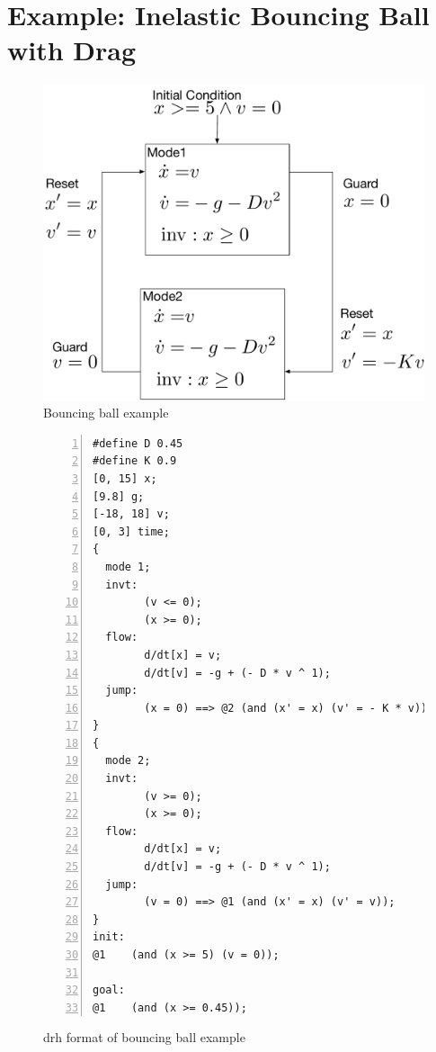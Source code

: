 \section{Example: Inelastic Bouncing Ball with Drag}
\begin{figure}
  \centering
  \includegraphics[width=0.5 \textwidth]{images/bouncing_ball.pdf}
  \caption{Bouncing ball example}
  \label{fig:bouncing-ball}
\end{figure}


\begin{figure}[!h]
  \centering
  \begin{Verbatim}[fontfamily=courier, frame=single, framesep=1mm,
  numbers=left, fontsize=\scriptsize]
#define D 0.45
#define K 0.9
[0, 15] x;
[9.8] g;
[-18, 18] v;
[0, 3] time;
{
  mode 1;
  invt:
        (v <= 0);
        (x >= 0);
  flow:
        d/dt[x] = v;
        d/dt[v] = -g + (- D * v ^ 1);
  jump:
        (x = 0) ==> @2 (and (x' = x) (v' = - K * v));
}
{
  mode 2;
  invt:
        (v >= 0);
        (x >= 0);
  flow:
        d/dt[x] = v;
        d/dt[v] = -g + (- D * v ^ 1);
  jump:
        (v = 0) ==> @1 (and (x' = x) (v' = v));
}
init:
@1    (and (x >= 5) (v = 0));

goal:
@1    (and (x >= 0.45));
\end{Verbatim}
  \caption{drh format of bouncing ball example}
  \label{fig:bouncing-ball-drh}
\end{figure}

